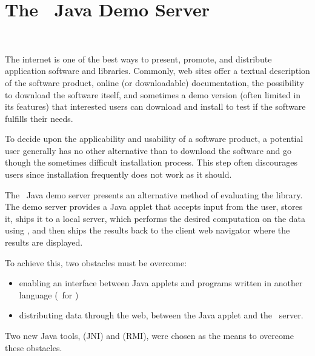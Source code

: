 
\chapter{The \cgal\ Java Demo Server}
\label{chap:java_demos}
 \\

The internet is one of the best ways to present, promote, and distribute 
application software and libraries. Commonly, web sites
offer a textual description of the software product, online (or
downloadable) documentation, the possibility to download the software
itself, and sometimes a demo version (often limited in its features)
that interested users can download and install to test if the software
fulfills their needs. 

To decide upon the applicability and usability of a software product,
a potential user generally has no other alternative than to download
the software and go though the sometimes difficult installation process.
This step often discourages users since installation frequently 
does not work as it should. 

The \cgal\ Java demo server presents an alternative method of 
evaluating the library.  The demo server provides a Java applet that accepts
input from the user, stores it, ships it to a local server, which performs the
desired computation on the data using \cgal, and then ships the results back
to the client web navigator where the results are displayed.

To achieve this, two obstacles must be overcome:
\begin{itemize} 
   \item enabling an interface between Java applets and programs written in 
         another language (\CC\ for \cgal)
   \item distributing data through the web, between the Java applet and the
         \cgal\ server. 
\end{itemize}
Two new Java tools,  (JNI) and 
(RMI), were chosen as the means to overcome these obstacles.

